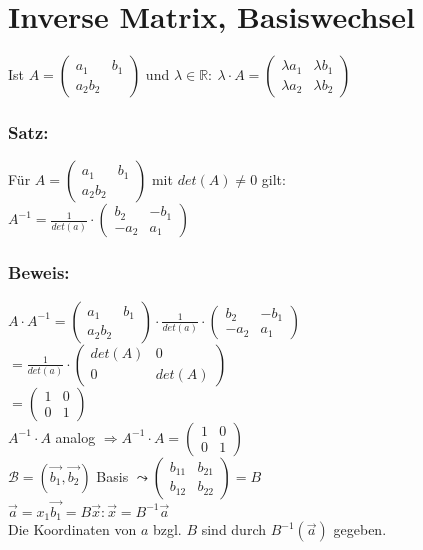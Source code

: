 \section{Inverse Matrix, Basiswechsel}
Ist $A=\begin{pmatrix}a_{1} & b_{1} \\ a_{2} b_{2} \end{pmatrix}$ und $\lambda \in \mathbb{R}: \ \lambda \cdot A = \begin{pmatrix} \lambda a_{1} & \lambda b_{1} \\ \lambda a_{2} & \lambda b_{2} \end{pmatrix}$\\
%
%
%
\subsubsection{Satz:}
Für $A=\begin{pmatrix}a_{1} & b_{1} \\ a_{2} b_{2} \end{pmatrix}$ mit $det(A) \neq 0$ gilt:\\
$A^{-1} = \frac{1}{det(a)} \cdot \begin{pmatrix} b_{2} & -b_{1} \\ -a_{2} & a_{1} \end{pmatrix}$
%
%
%
\subsubsection{Beweis:}
$A\cdot A^{-1} = \begin{pmatrix}a_{1} & b_{1} \\ a_{2} b_{2} \end{pmatrix} \cdot \frac{1}{det(a)} \cdot \begin{pmatrix} b_{2} & -b_{1} \\ -a_{2} & a_{1} \end{pmatrix}$\\
$ = \frac{1}{det(a)} \cdot \begin{pmatrix} det(A) & 0 \\ 0 & det(A) \end{pmatrix}$\\
$= \begin{pmatrix} 1 & 0 \\ 0 & 1 \end{pmatrix}$\\
$A^{-1}\cdot A$ analog $\Rightarrow A^{-1} \cdot A = \begin{pmatrix} 1 & 0 \\ 0 & 1 \end{pmatrix}$ \\
$\mathcal{B} = (\vec{b_{1}}, \vec{b_{2}})$ Basis $ \leadsto \begin{pmatrix} b_{11} & b_{21} \\ b_{12} & b_{22} \end{pmatrix} = B$\\
$\vec{a} = x_{1}\vec{b_{1}} = B\vec{x} : \vec{x} = B^{-1}\vec{a}$\\
Die Koordinaten von $a$ bzgl. $B$ sind durch $B^{-1}(\vec{a})$ gegeben.